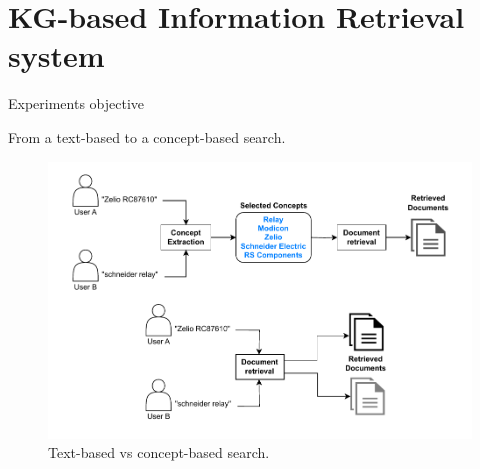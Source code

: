 \section{KG-based Information Retrieval system}

\begin{frame}{Experiments objective}

    \begin{center}
        From a text-based to a concept-based search.
    \end{center}

    \begin{figure} [H]
        \begin{center}
            \includegraphics[scale=0.6]{images/text-vs-concept-based-search.pdf} 
            \caption{Text-based vs concept-based search.} 
        \end{center}
    \end{figure}

\end{frame}


